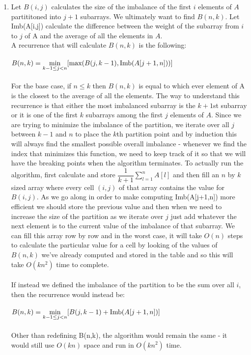 \documentclass{article}
\begin{document}
\begin{enumerate}
	
	\item Let $B(i,j)$ calculates the size of the imbalance of the first $i$ elements of $A$ partititoned into $j+1$ subarrays. We ultimately want to find $B(n,k)$. Let Imb(A[i,j]) calculate the difference between the weight of the subarray from $i$ to $j$ of A and the average of all the elements in $A$.   \\
	A recurrence that will calculate $B(n,k)$ is the following:\\\\
	$B(n,k) = \displaystyle\min_{k-1\leq j<n}[\textup{max}(B(j,k-1), \textup{Imb}(A[j+1,n]))]$ \\\\
	For the base case, if $n\leq k$ then $B(n,k)$ is equal to which ever element of A is the closest to the average of all the elements.  The way to understand this recurrence is that either the most imbalanced subarray is the $k+1$st subarray or it is one of the first $k$ subarrays among the first $j$ elements of $A$.  Since we are trying to minimize the imbalance of the partition, we iterate over all $j$ between $k-1$ and $n$ to place the $k$th partition point and by induction this will always find the smallest possible overall imbalance - whenever we find the index that minimizes this function, we need to keep track of it so that we will have the breaking points when the algorithm terminates. To actually run the algorithm, first calculate and store $\dfrac{1}{k+1}\displaystyle\sum_{l=1}^{n}A[l]$ and then fill an $n$ by $k$ sized array where every cell $(i,j)$ of that array contains the value for $B(i,j)$.  As we go along in order to make computing Imb(A[j+1,n]) more efficient we should store the previous value and then when we need to increase the size of the partition as we iterate over $j$ just add whatever the next element is to the current value of the imbalance of that subarray. We can fill this array row by row and in the worst case, it will take $O(n)$ steps to calculate the particular value for a cell by looking of the values of $B(n,k)$ we've already computed and stored in the table and so this will take $O(kn^2)$ time to complete.  \\\\
	If instead we defined the imbalance of the partition to be the sum over all $i$, then the recurrence would instead be: \\\\ 
	$B(n,k) = \displaystyle\min_{k-1\leq j<n}[B(j,k-1) +  \textup{Imb}(A[j+1,n])]$ \\\\
	Other than redefining B(n,k), the algorithm would remain the same - it would still use $O(kn)$ space and run in $O(kn^2)$ time.   
	

\end{enumerate}
\end{document}
